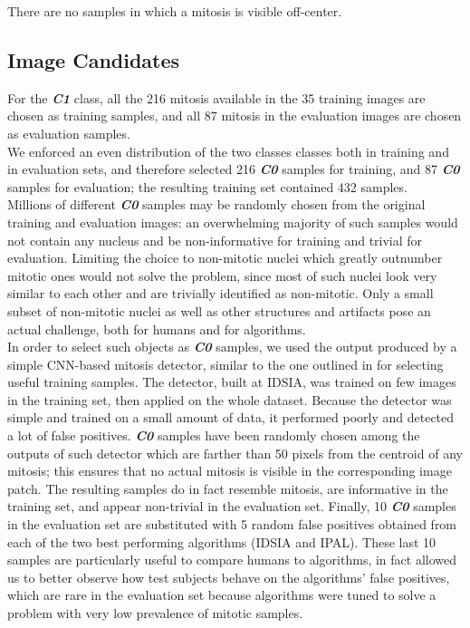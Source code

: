 There are no samples in which a mitosis is visible off-center.

\vspace{0.5cm}

\subsection{Image Candidates}
\label{ch4:ic}

For the \textit{\textbf{C1}} class, all the 216 mitosis available in the 35 training images are chosen
as training samples, and all 87 mitosis in the evaluation images are chosen as
evaluation samples.\\
We enforced an even distribution of the two classes classes both in training and in evaluation sets, and therefore
selected 216 \textit{\textbf{C0}} samples for training, and 87 \textit{\textbf{C0}} samples for evaluation; the resulting
training set contained 432 samples.\\
Millions of different \textit{\textbf{C0}} samples may be randomly chosen from the original training and evaluation images:
an overwhelming majority of such samples would not contain any nucleus and be non-informative for training and trivial for
evaluation. Limiting the choice to non-mitotic nuclei \texttwelveudash{} which greatly outnumber
mitotic ones \texttwelveudash{} would not solve the problem, since most of such nuclei look very
similar to each other and are trivially identified as non-mitotic. Only a small
subset of non-mitotic nuclei \texttwelveudash{} as well as other structures and artifacts \texttwelveudash{} pose an
actual challenge, both for humans and for algorithms.\\
In order to select such objects as \textit{\textbf{C0}} samples, we used the output produced by a simple \Gls{CNN}-based mitosis detector,
similar to the one outlined in \cite{agNN} for selecting useful training samples.
The detector, built at IDSIA, was trained on few images in the training set, then applied on the whole dataset.
Because the detector was simple and trained on a small amount of data, it performed poorly and detected a lot of false positives.
\textit{\textbf{C0}} samples have been randomly chosen among the outputs of such detector which are
farther than 50 pixels from the centroid of any mitosis; this ensures that no actual
mitosis is visible in the corresponding image patch. The resulting samples do in
fact resemble mitosis, are informative in the training set, and appear non-trivial
in the evaluation set. Finally, 10 \textit{\textbf{C0}} samples in the evaluation set are substituted
with 5 random false positives obtained from each of the two best performing
algorithms (IDSIA and IPAL). These last 10 samples are particularly useful to compare humans to algorithms, in fact allowed us to better observe how test subjects
behave on the algorithms’ false positives, which are rare in the evaluation set because
algorithms were tuned to solve a problem with very low prevalence of mitotic samples.


